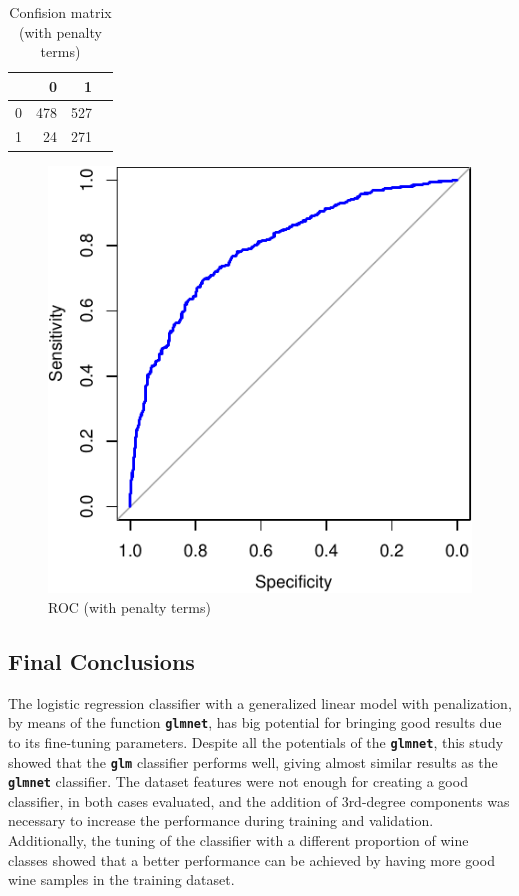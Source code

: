 \documentclass[a4paperpaper,9pt,twocolumn,twoside,printwatermark=false]{pinp}
\begin{document}
\begin{table}[ht]
\begin{center}
\begin{tabular}{rrrr}
\hline
 & 0 & 1 \\
\hline
0 & 478 & 527 \\
1 & 24 & 271 \\
\hline
\end{tabular}
\caption{\label{tab:ConfusionMatrix2}Confision matrix (with penalty terms)}
\end{center}
\end{table}

\begin{figure}

{\centering \includegraphics{WineQualityAnalysis_files/figure-latex/ROC2-1} 

}

\caption{ROC (with penalty terms)}\label{fig:ROC2}
\end{figure}

\subsection{Final Conclusions}\label{final-conclusions}

The logistic regression classifier with a generalized linear model with
penalization, by means of the function \textbf{\texttt{glmnet}}, has big
potential for bringing good results due to its fine-tuning parameters.
Despite all the potentials of the \textbf{\texttt{glmnet}}, this study
showed that the \textbf{\texttt{glm}} classifier performs well, giving
almost similar results as the \textbf{\texttt{glmnet}} classifier. The
dataset features were not enough for creating a good classifier, in both
cases evaluated, and the addition of 3rd-degree components was necessary
to increase the performance during training and validation.
Additionally, the tuning of the classifier with a different proportion
of wine classes showed that a better performance can be achieved by
having more good wine samples in the training dataset.





\end{document}
